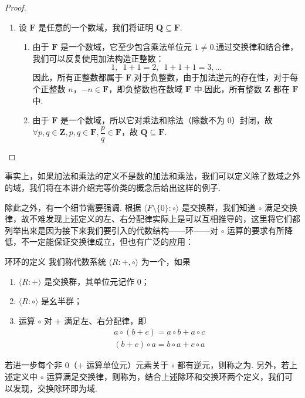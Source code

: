 \begin{proof}
\begin{enumerate}
    \item 设 $\mathbf{F}$ 是任意的一个数域，我们将证明 $\mathbf{Q} \subseteq \mathbf{F}$.
    \begin{enumerate}
        \item 由于 $\mathbf{F}$ 是一个数域，它至少包含乘法单位元 $1 \neq 0$.通过交换律和结合律，我们可以反复使用加法构造正整数：
        \[
        1, \enspace 1 + 1 = 2, \enspace 1 + 1 + 1 = 3, \ldots
        \]
        因此，所有正整数都属于 $\mathbf{F}$.对于负整数，由于加法逆元的存在性，对于每个正整数 $n$，$-n \in \mathbf{F}$，即负整数也在数域 $\mathbf{F}$ 中.因此，所有整数 $\mathbf{Z}$ 都在 $\mathbf{F}$ 中.
        \item 由于 $\mathbf{F}$ 是一个数域，所以它对乘法和除法（除数不为 $0$）封闭，故 $\forall p,q \in \mathbf{Z}, p,q \in \mathbf{F}, \dfrac{p}{q} \in \mathbf{F}$，故 $\mathbf{Q} \subseteq \mathbf{F}$.
    \end{enumerate}
\end{enumerate}
\end{proof}

事实上，如果加法和乘法的定义不是数的加法和乘法，我们可以定义除了数域之外的域，我们将在本讲介绍完等价类的概念后给出这样的例子.

除此之外，有一个细节需要强调. 根据 $\langle F\setminus\{0\}\colon\circ\rangle$ 是交换群，我们知道 $\circ$ 满足交换律，故不难发现上述定义的左、右分配律实际上是可以互相推导的，这里将它们都列举出来是因为接下来我们要引入的代数结构——环——对 $\circ$ 运算的要求有所降低，不一定能保证交换律成立，但也有广泛的应用：

\begin{definition}{环}{环的定义} 
    我们称代数系统 $\langle R\colon+,\circ\rangle$ 为一个，如果
    \begin{enumerate}
        \item $\langle R\colon+\rangle$ 是交换群，其单位元记作 $0$；

        \item $\langle R\colon\circ\rangle$ 是幺半群；

        \item 运算 $\circ$ 对 $+$ 满足左、右分配律，即
              \begin{gather*}
                  a \circ (b + c) = a \circ b + a \circ c \\
                  (b + c) \circ a = b \circ a + c \circ a
              \end{gather*}
    \end{enumerate}

    若进一步每个非 $0$（$+$ 运算单位元）元素关于 $\circ$ 都有逆元，则称之为. 另外，若上述定义中 $\circ$ 运算满足交换律，则称为，结合上述除环和交换环两个定义，我们可以发现，交换除环即为域.
\end{definition}

